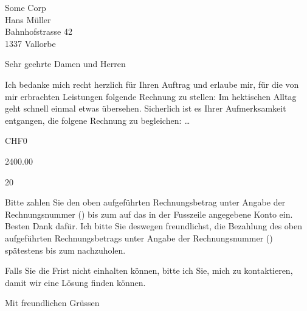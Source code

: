 \documentclass[DIN,SN,10pt,DIV=18,_rechnung]{scrlttr2}
\def\Total{Rechnungsbetrag}
\begin{document}
  \begin{letter}{
      Some Corp \\
      Hans Müller \\
      Bahnhofstrasse 42 \\
      1337 Vallorbe
    }

    \opening{Sehr geehrte Damen und Herren}
    \thispagestyle{plain}

    \ifnum{}
      Ich bedanke mich recht herzlich für Ihren Auftrag und erlaube mir, für die
      von mir erbrachten Leistungen folgende Rechnung zu stellen:
    \else
      \ifnum{}
        Im hektischen Alltag geht schnell einmal etwas übersehen.
        Sicherlich ist es Ihrer Aufmerksamkeit entgangen, die folgene Rechnung zu begleichen:
      \else
        \dots
      \fi
    \fi

    \begin{invoice}{CHF}{0}

       {2400.00}
      \STExpenses


       {20}

    \end{invoice}

    \begin{samepage}
      \ifnum{}
        Bitte zahlen Sie den oben aufgeführten {\Total} unter Angabe der
        Rechnungsnummer () bis zum  auf
        das in der Fusszeile angegebene Konto ein.\\
        Besten Dank dafür.
      \else
        Ich bitte Sie deswegen freundlichst, die Bezahlung des oben aufgeführten
        {\Total}s unter Angabe der Rechnungsnummer () spätestens
        bis zum  nachzuholen.

        Falls Sie die Frist nicht einhalten können, bitte ich Sie, mich zu
        kontaktieren, damit wir eine Lösung finden können.
      \fi

      \closing{Mit freundlichen Grüssen}

    \end{samepage}
 \end{letter}
\end{document}
